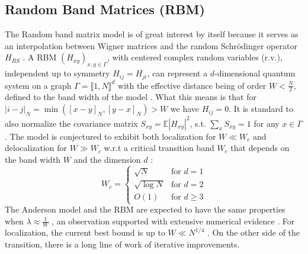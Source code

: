 \documentclass[11pt]{article}
\begin{document}
\subsection*{Random Band Matrices (RBM)}
The Random band matrix model is of great interest by itself because it serves as an interpolation between Wigner matrices and the random Schrödinger operator $H_{RS}$ \cite{dynamic}. A RBM $(H_{xy})_{x, y\in \Gamma}$, with centered complex random variables (r.v.), independent up to symmetry $H_{ij} = \overline{H_{ji}}$, can represent a $d$-dimensional quantum system on a graph $\Gamma = \llbracket 1, N\rrbracket ^d$ with the effective distance being of order $W<\frac{N}{2}$, defined to the band width of the model \cite{7, 21}.  What this means is that for $|i-j|_{N} = \min\left([x-y]_N, [y-x]_N\right)>W$ we have $H_{ij}=0$. It is standard to also normalize the covariance matrix $S_{xy} = \mathbb{E} |H_{xy}|^2$, s.t. $\sum_x S_{xy}=1$ for any $x\in \Gamma$. The model is conjectured to exhibit both localization for $W\ll W_c$ and delocalization for $W\gg W_c$ w.r.t a critical transition band $W_c$ that depends on the band width $W$ and the dimension $d$ \cite{7}:  \[
W_c = 
\begin{cases} 
\sqrt{N} & \text{for } d=1 \\ 
\sqrt{\log N} & \text{for } d=2 \\
O(1) & \text{for } d\geq 3

\end{cases}
\]
The Anderson model and the RBM are expected to have the same properties when $\lambda  \approx \frac{1}{W}$ \cite{7}, an observation supported with extensive numerical evidence \cite{arbm1, arbm2}. For localization, the current best bound is up to $W\ll N^{1/4}$ \cite{13}. On the other side of the transition, there is a long line of work of iterative improvements.\vspace{0.25 cm}
\end{document}
